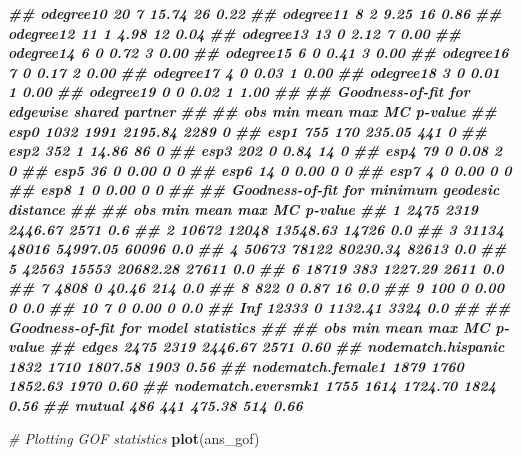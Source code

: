 \documentclass[
]{book}
\newenvironment{Shaded}{\begin{snugshade}}{\end{snugshade}}
\newcommand{\CommentTok}[1]{\textcolor[rgb]{0.56,0.35,0.01}{\textit{#1}}}
\newcommand{\DocumentationTok}[1]{\textcolor[rgb]{0.56,0.35,0.01}{\textbf{\textit{#1}}}}
\newcommand{\FunctionTok}[1]{\textcolor[rgb]{0.13,0.29,0.53}{\textbf{#1}}}
\newcommand{\NormalTok}[1]{#1}
\begin{document}
\begin{Shaded}
\begin{Highlighting}[]
\DocumentationTok{\#\# odegree10  20   7 15.74  26       0.22}
\DocumentationTok{\#\# odegree11   8   2  9.25  16       0.86}
\DocumentationTok{\#\# odegree12  11   1  4.98  12       0.04}
\DocumentationTok{\#\# odegree13  13   0  2.12   7       0.00}
\DocumentationTok{\#\# odegree14   6   0  0.72   3       0.00}
\DocumentationTok{\#\# odegree15   6   0  0.41   3       0.00}
\DocumentationTok{\#\# odegree16   7   0  0.17   2       0.00}
\DocumentationTok{\#\# odegree17   4   0  0.03   1       0.00}
\DocumentationTok{\#\# odegree18   3   0  0.01   1       0.00}
\DocumentationTok{\#\# odegree19   0   0  0.02   1       1.00}
\DocumentationTok{\#\# }
\DocumentationTok{\#\# Goodness{-}of{-}fit for edgewise shared partner }
\DocumentationTok{\#\# }
\DocumentationTok{\#\#       obs  min    mean  max MC p{-}value}
\DocumentationTok{\#\# esp0 1032 1991 2195.84 2289          0}
\DocumentationTok{\#\# esp1  755  170  235.05  441          0}
\DocumentationTok{\#\# esp2  352    1   14.86   86          0}
\DocumentationTok{\#\# esp3  202    0    0.84   14          0}
\DocumentationTok{\#\# esp4   79    0    0.08    2          0}
\DocumentationTok{\#\# esp5   36    0    0.00    0          0}
\DocumentationTok{\#\# esp6   14    0    0.00    0          0}
\DocumentationTok{\#\# esp7    4    0    0.00    0          0}
\DocumentationTok{\#\# esp8    1    0    0.00    0          0}
\DocumentationTok{\#\# }
\DocumentationTok{\#\# Goodness{-}of{-}fit for minimum geodesic distance }
\DocumentationTok{\#\# }
\DocumentationTok{\#\#       obs   min     mean   max MC p{-}value}
\DocumentationTok{\#\# 1    2475  2319  2446.67  2571        0.6}
\DocumentationTok{\#\# 2   10672 12048 13548.63 14726        0.0}
\DocumentationTok{\#\# 3   31134 48016 54997.05 60096        0.0}
\DocumentationTok{\#\# 4   50673 78122 80230.34 82613        0.0}
\DocumentationTok{\#\# 5   42563 15553 20682.28 27611        0.0}
\DocumentationTok{\#\# 6   18719   383  1227.29  2611        0.0}
\DocumentationTok{\#\# 7    4808     0    40.46   214        0.0}
\DocumentationTok{\#\# 8     822     0     0.87    16        0.0}
\DocumentationTok{\#\# 9     100     0     0.00     0        0.0}
\DocumentationTok{\#\# 10      7     0     0.00     0        0.0}
\DocumentationTok{\#\# Inf 12333     0  1132.41  3324        0.0}
\DocumentationTok{\#\# }
\DocumentationTok{\#\# Goodness{-}of{-}fit for model statistics }
\DocumentationTok{\#\# }
\DocumentationTok{\#\#                     obs  min    mean  max MC p{-}value}
\DocumentationTok{\#\# edges              2475 2319 2446.67 2571       0.60}
\DocumentationTok{\#\# nodematch.hispanic 1832 1710 1807.58 1903       0.56}
\DocumentationTok{\#\# nodematch.female1  1879 1760 1852.63 1970       0.60}
\DocumentationTok{\#\# nodematch.eversmk1 1755 1614 1724.70 1824       0.56}
\DocumentationTok{\#\# mutual              486  441  475.38  514       0.66}

\CommentTok{\# Plotting GOF statistics}
\FunctionTok{plot}\NormalTok{(ans\_gof)}
\end{Highlighting}
\end{Shaded}
\end{document}
